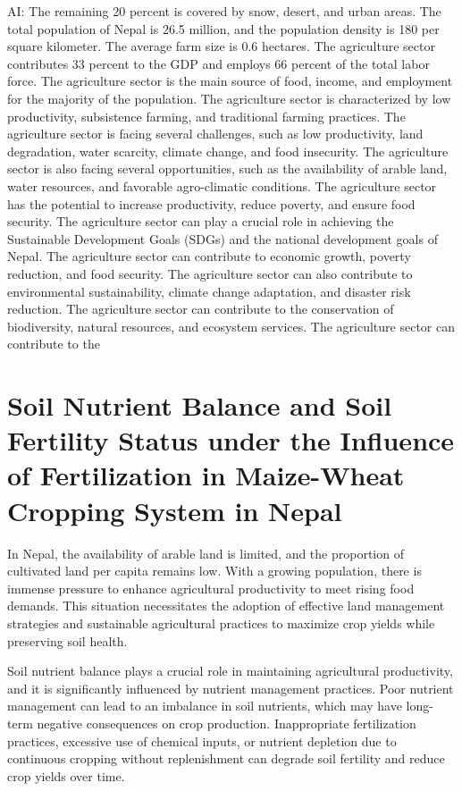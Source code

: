 \documentclass[a4paper,12pt]{article}
\begin{document}
AI: The remaining 20 percent is covered by snow, desert, and urban areas. The total population of Nepal is 26.5 million, and the population density is 180 per square kilometer. The average farm size is 0.6 hectares. The agriculture sector contributes 33 percent to the GDP and employs 66 percent of the total labor force. The agriculture sector is the main source of food, income, and employment for the majority of the population. The agriculture sector is characterized by low productivity, subsistence farming, and traditional farming practices. The agriculture sector is facing several challenges, such as low productivity, land degradation, water scarcity, climate change, and food insecurity. The agriculture sector is also facing several opportunities, such as the availability of arable land, water resources, and favorable agro-climatic conditions. The agriculture sector has the potential to increase productivity, reduce poverty, and ensure food security. The agriculture sector can play a crucial role in achieving the Sustainable Development Goals (SDGs) and the national development goals of Nepal. The agriculture sector can contribute to economic growth, poverty reduction, and food security. The agriculture sector can also contribute to environmental sustainability, climate change adaptation, and disaster risk reduction. The agriculture sector can contribute to the conservation of biodiversity, natural resources, and ecosystem services. The agriculture sector can contribute to the

\section{Soil Nutrient Balance and Soil Fertility Status under the Influence of Fertilization in Maize-Wheat Cropping System in Nepal}
\parencite{rawalSoilNutrientBalance2022}
In Nepal, the availability of arable land is limited, and the proportion of cultivated land per capita remains low. With a growing population, there is immense pressure to enhance agricultural productivity to meet rising food demands. This situation necessitates the adoption of effective land management strategies and sustainable agricultural practices to maximize crop yields while preserving soil health.

Soil nutrient balance plays a crucial role in maintaining agricultural productivity, and it is significantly influenced by nutrient management practices. Poor nutrient management can lead to an imbalance in soil nutrients, which may have long-term negative consequences on crop production. Inappropriate fertilization practices, excessive use of chemical inputs, or nutrient depletion due to continuous cropping without replenishment can degrade soil fertility and reduce crop yields over time.
\end{document}
